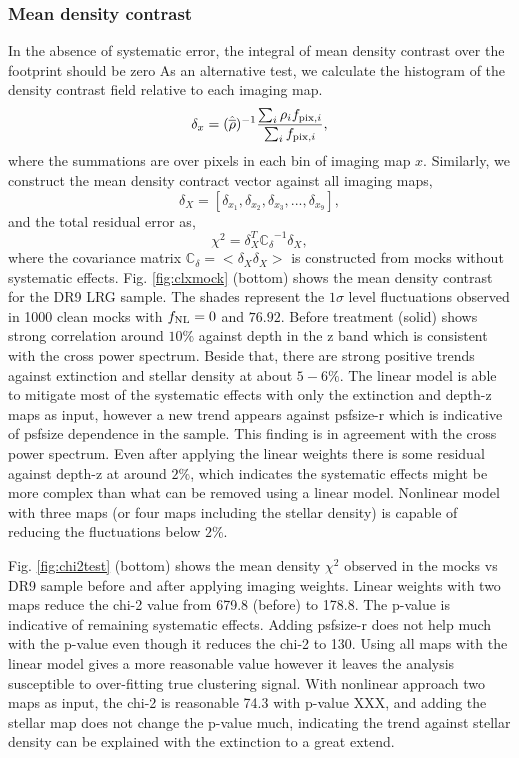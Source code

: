 \subsubsection{Mean density contrast}
In the absence of systematic error, the integral of mean density contrast over the footprint should be zero As an alternative test, we calculate the histogram of the density contrast field relative to each imaging map.
\begin{equation}
\delta_{x} = ({\hat{\overline{\rho}}})^{-1} \frac{\sum_{i} \rho_{i} f_{{\rm pix}, i}}{\sum_{i} f_{{\rm pix}, i}},
\end{equation}
where the summations are over pixels in each bin of imaging map $x$. Similarly, we construct the mean density contract vector against all imaging maps,
\begin{equation}
\delta_{X} = [\delta_{x_{1}}, \delta_{x_{2}}, \delta_{x_{3}}, ..., \delta_{x_{9}}],
\end{equation}
and the total residual error as,
\begin{equation}
\chi^{2} = \delta_{X}^{T} \mathbb{C_{\delta}}^{-1} \delta_{X},
\end{equation}
where the covariance matrix $\mathbb{C}_{\delta} = < \delta_{X} \delta_{X}>$ is constructed from mocks without systematic effects. Fig. \ref{fig:clxmock} (bottom) shows the mean density contrast for the DR9 LRG sample. The shades represent the $1\sigma$ level fluctuations observed in 1000 clean mocks with $f_{\rm NL}=0$ and $76.92$. Before treatment (solid) shows strong correlation around $10\%$ against depth in the z band which is consistent with the cross power spectrum. Beside that, there are strong positive trends against extinction and stellar density at about $5-6\%$. The linear model is able to mitigate most of the systematic effects with only the extinction and depth-z maps as input, however a new trend appears against psfsize-r which is indicative of psfsize dependence in the sample. This finding is in agreement with the cross power spectrum. Even after applying the linear weights there is some residual against depth-z at around $2\%$, which indicates the systematic effects might be more complex than what can be removed using a linear model. Nonlinear model with three maps (or four maps including the stellar density) is capable of reducing the fluctuations below $2\%$. 


Fig. \ref{fig:chi2test} (bottom) shows the mean density $\chi^{2}$ observed in the mocks vs DR9 sample before and after applying imaging weights. Linear weights with two maps reduce the chi-2 value from 679.8 (before) to 178.8. The p-value is indicative of remaining systematic effects. Adding psfsize-r does not help much with the p-value even though it reduces the chi-2 to 130. Using all maps with the linear model gives a more reasonable value however it leaves the analysis susceptible to over-fitting true clustering signal. With nonlinear approach two maps as input, the chi-2 is reasonable 74.3 with p-value XXX, and adding the stellar map does not change the p-value much, indicating the trend against stellar density can be explained with the extinction to a great extend. 